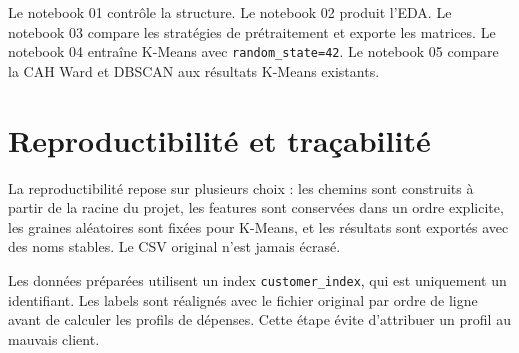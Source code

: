 Le notebook 01 contrôle la structure. Le notebook 02 produit l'EDA. Le notebook 03 compare les stratégies de prétraitement et exporte les matrices. Le notebook 04 entraîne K-Means avec \texttt{random\_state=42}. Le notebook 05 compare la CAH Ward et DBSCAN aux résultats K-Means existants.

\section{Reproductibilité et traçabilité}
La reproductibilité repose sur plusieurs choix : les chemins sont construits à partir de la racine du projet, les features sont conservées dans un ordre explicite, les graines aléatoires sont fixées pour K-Means, et les résultats sont exportés avec des noms stables. Le CSV original n'est jamais écrasé.

Les données préparées utilisent un index \texttt{customer\_index}, qui est uniquement un identifiant. Les labels sont réalignés avec le fichier original par ordre de ligne avant de calculer les profils de dépenses. Cette étape évite d'attribuer un profil au mauvais client.
